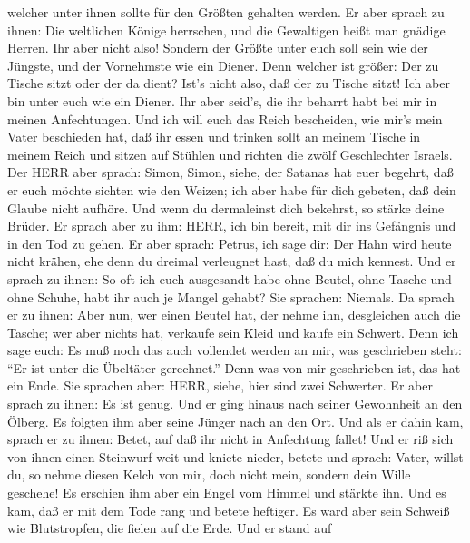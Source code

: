 welcher unter ihnen sollte für den Größten gehalten werden.
 Er aber sprach zu ihnen: Die weltlichen Könige herrschen,
und die Gewaltigen heißt man gnädige Herren.  Ihr aber
nicht also! Sondern der Größte unter euch soll sein wie der Jüngste, und
der Vornehmste wie ein Diener.  Denn welcher ist größer:
Der zu Tische sitzt oder der da dient? Ist's nicht also, daß der zu
Tische sitzt! Ich aber bin unter euch wie ein Diener.  Ihr
aber seid's, die ihr beharrt habt bei mir in meinen Anfechtungen.
 Und ich will euch das Reich bescheiden, wie mir's mein
Vater beschieden hat,  daß ihr essen und trinken sollt an
meinem Tische in meinem Reich und sitzen auf Stühlen und richten die
zwölf Geschlechter Israels.  Der HERR aber sprach: Simon,
Simon, siehe, der Satanas hat euer begehrt, daß er euch möchte sichten
wie den Weizen;  ich aber habe für dich gebeten, daß dein
Glaube nicht aufhöre. Und wenn du dermaleinst dich bekehrst, so stärke
deine Brüder.  Er sprach aber zu ihm: HERR, ich bin bereit,
mit dir ins Gefängnis und in den Tod zu gehen.  Er aber
sprach: Petrus, ich sage dir: Der Hahn wird heute nicht krähen, ehe denn
du dreimal verleugnet hast, daß du mich kennest.  Und er
sprach zu ihnen: So oft ich euch ausgesandt habe ohne Beutel, ohne
Tasche und ohne Schuhe, habt ihr auch je Mangel gehabt? Sie sprachen:
Niemals.  Da sprach er zu ihnen: Aber nun, wer einen Beutel
hat, der nehme ihn, desgleichen auch die Tasche; wer aber nichts hat,
verkaufe sein Kleid und kaufe ein Schwert.  Denn ich sage
euch: Es muß noch das auch vollendet werden an mir, was geschrieben
steht: ``Er ist unter die Übeltäter gerechnet.'' Denn was von mir
geschrieben ist, das hat ein Ende.  Sie sprachen aber:
HERR, siehe, hier sind zwei Schwerter. Er aber sprach zu ihnen: Es ist
genug.  Und er ging hinaus nach seiner Gewohnheit an den
Ölberg. Es folgten ihm aber seine Jünger nach an den Ort. 
Und als er dahin kam, sprach er zu ihnen: Betet, auf daß ihr nicht in
Anfechtung fallet!  Und er riß sich von ihnen einen
Steinwurf weit und kniete nieder, betete  und sprach:
Vater, willst du, so nehme diesen Kelch von mir, doch nicht mein,
sondern dein Wille geschehe!  Es erschien ihm aber ein
Engel vom Himmel und stärkte ihn.  Und es kam, daß er mit
dem Tode rang und betete heftiger. Es ward aber sein Schweiß wie
Blutstropfen, die fielen auf die Erde.  Und er stand auf
